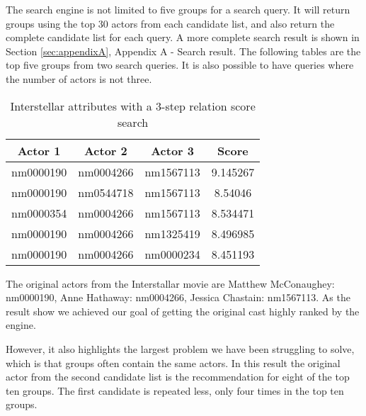 The search engine is not limited to five groups for a search query. It will return groups using the top 30 actors from each candidate list, and also return the complete candidate list for each query. A more complete search result is shown in Section \ref{sec:appendixA}, Appendix A - Search result. The following tables are the top five groups from two search queries. It is also possible to have queries where the number of actors is not three. 



\begin{table}[H]
\centering
    \begin{tabular}{ |c|c|c|c| } 
        \hline
        \textbf{Actor 1} & \textbf{Actor 2} & \textbf{Actor 3} & \textbf{Score} \\ 
        \hline
        nm0000190 & nm0004266 & nm1567113  & 9.145267 \\ 
        nm0000190 & nm0544718 & nm1567113  & 8.54046 \\ 
        nm0000354 & nm0004266 & nm1567113  & 8.534471 \\ 
        nm0000190 & nm0004266 & nm1325419  & 8.496985 \\ 
        nm0000190 & nm0004266 & nm0000234  & 8.451193 \\ 
        \hline
    \end{tabular}
	\caption{Interstellar attributes with a 3-step relation score search}
	\label{tab:3-step relation score}
\end{table}



The original actors from the Interstallar movie are Matthew McConaughey: nm0000190, Anne Hathaway: nm0004266, Jessica Chastain: nm1567113. As the result show we achieved our goal of getting the original cast highly ranked by the engine.

However, it also highlights the largest problem we have been struggling to solve, which is that groups often contain the same actors. In this result the original actor from the second candidate list is the recommendation for eight of the top ten groups. The first candidate is repeated less, only four times in the top ten groups.



